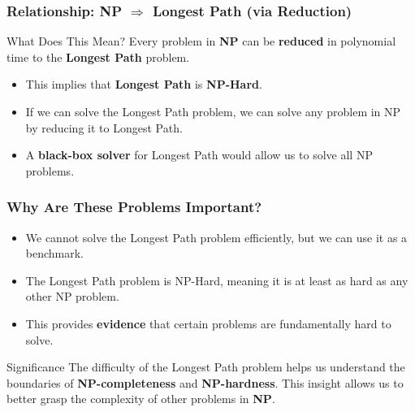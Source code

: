 \documentclass[10pt,aspectratio=43]{beamer}
\begin{document}

\begin{frame}
    \frametitle{Relationship: NP $\Rightarrow$ Longest Path (via Reduction)}

    \begin{block}{What Does This Mean?}
        Every problem in \textbf{NP} can be \textbf{reduced} in polynomial time to the \textbf{Longest Path} problem.
    \end{block}

    \vspace{0.5em}

    \begin{itemize}
        \item This implies that \textbf{Longest Path} is \textbf{NP-Hard}.
        \item If we can solve the Longest Path problem, we can solve any problem in NP by reducing it to Longest Path.
        \item A \textbf{black-box solver} for Longest Path would allow us to solve all NP problems.
    \end{itemize}
\end{frame}


\begin{frame}
    \frametitle{Why Are These Problems Important?}
    \begin{itemize}
        \item We cannot solve the Longest Path problem efficiently, but we can use it as a benchmark.
        \item The Longest Path problem is NP-Hard, meaning it is at least as hard as any other NP problem.
        \item This provides \textbf{evidence} that certain problems are fundamentally hard to solve.
    \end{itemize}

    \vspace{0.5em}

    \begin{block}{Significance}
        The difficulty of the Longest Path problem helps us understand the boundaries of \textbf{NP-completeness} and \textbf{NP-hardness}.
        This insight allows us to better grasp the complexity of other problems in \textbf{NP}.
    \end{block}
\end{frame}

\end{document}

